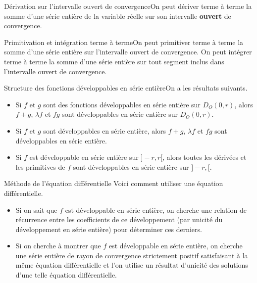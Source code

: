 \documentclass[french]{book}
\theoremstyle{plain}
\theoremstyle{definition}
\theoremstyle{remark}
\begin{document}
\begin{PM}{Dérivation sur l'intervalle ouvert de convergence}On peut dériver terme à terme la somme d'une série entière de la variable réelle sur son intervalle \textbf{ouvert} de convergence.
\end{PM}
\begin{PM}{Primitivation et intégration terme à terme}On peut primitiver terme à terme la somme d'une série entière sur l'intervalle ouvert de convergence. On peut intégrer terme à terme la somme d'une série entière sur tout segment inclus dans l'intervalle ouvert de convergence.
\end{PM}
\begin{PM}{Structure des fonctions développables en série entière}On a les résultats suivants.
\begin{itemize}
	\item Si $f$ et $g$ sont des fonctions développables en série entière sur $D_O(0,r)$, alors $f+g$, $\lambda f$ et $fg$ sont développables en série entière sur $D_O(0,r)$.
	\item Si $f$ et $g$ sont développables en série entière, alors $f+g$, $\lambda f$ et $fg$ sont développables en série entière.
	\item Si $f$ est développable en série entière sur $]-r,r[$, alors toutes les dérivées et les primitives de $f$ sont développables en série entière sur $]-r,[$.
\end{itemize}
\end{PM}
\begin{PM}{Méthode de l'équation différentielle} Voici comment utiliser une équation différentielle.
\begin{itemize}
	\item Si on sait que $f$ est développable en série entière, on cherche une relation de récurrence entre les coefficients de ce développement (par unicité du développement en série entière) pour déterminer ces derniers.
	\item Si on cherche à montrer que $f$ est développable en série entière, on cherche une série entière de rayon de convergence strictement positif satisfaisant à la même équation différentielle et l'on utilise un résultat d'unicité des solutions d'une telle équation différentielle.
\end{itemize}
\end{PM}
\end{document}
